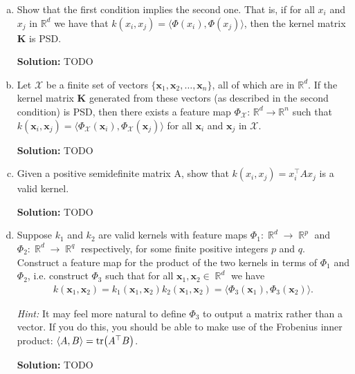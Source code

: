 \documentclass{article}
\DeclareMathOperator{\R}{\mathbb{R}}
\newcommand{\mat}[1]{\mathbf{#1}}
\newenvironment{solution}{\color{blue} \smallskip \textbf{Solution:}}{}
\begin{document}
\begin{enumerate}[(a)]
\item Show that the first condition implies the second one. That is, if for all $x_{i}$ and $x_{j}$ in $\mathbb{R}^{d}$ we have that $k(x_i, x_j) = \langle\Phi(x_i), \Phi(x_j) \rangle$, then the kernel matrix $\mat K$ is PSD.

\begin{solution}
TODO
\end{solution}

\clearpage
\item Let $\mathcal{X}$ be a finite set of vectors $\{\mathbf{x}_1, \mathbf{x}_2, \ldots, \mathbf{x}_n\}$, all of which are in $\mathbb{R}^{d}$. If the kernel matrix $\mat{K}$ generated from these vectors (as described in the second condition) is PSD, then there exists a feature map $\Phi_{\mathcal{X}}$: $\mathbb{R}^{d} \rightarrow \mathbb{R}^{n}$ such that $k(\mathbf{x}_i, \mathbf{x}_j) = \langle \Phi_{\mathcal{X}}(\mathbf{x}_i), \Phi_{\mathcal{X}}(\mathbf{x}_j) \rangle$ for all $\mathbf{x}_i$ and $\mathbf{x}_j$ in $\mathcal{X}$.

\begin{solution}
TODO
\end{solution}

\clearpage
\item Given a positive semidefinite matrix A, show that $k(x_i, x_j) = x_i^\top Ax_j$ is a valid kernel.

\begin{solution}
TODO
\end{solution}

\clearpage
\item Suppose $k_1$ and $k_2$ are valid kernels with feature maps $\Phi_1 \colon \R^d \rightarrow \R^p$ and $\Phi_2 \colon \R^d \rightarrow \R^q$ respectively, for some finite positive integers $p$ and $q$. Construct a feature map for the product of the two kernels in terms of $\Phi_1$ and $\Phi_2$, i.e. construct $\Phi_3$ such that for all $\mathbf{x}_1, \mathbf{x}_2 \in \R^d$ we have 
\begin{align*}
k( \mathbf{x}_1, \mathbf{x}_2) = k_1( \mathbf{x}_1, \mathbf{x}_2) k_2( \mathbf{x}_1, \mathbf{x}_2) = \langle \Phi_3(\mathbf{x}_1) , \Phi_3(\mathbf{x}_2) \rangle. 
\end{align*}

\textit{Hint:} It may feel more natural to define $\Phi_3$ to output a matrix rather than a vector. If you do this, you should be able to make use of the Frobenius inner product: $\langle A, B\rangle = \tr (A^\top B)$.

\begin{solution}
TODO
\end{solution}
\end{enumerate}
\end{document}
